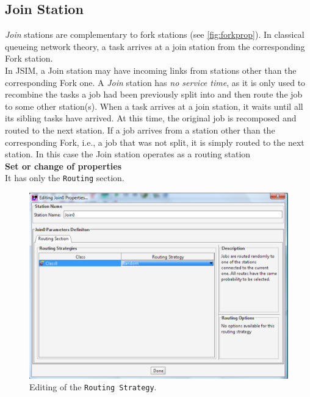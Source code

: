 \subsection{Join Station}
 \emph{Join} stations are complementary to fork
stations (see \autoref{fig:forkprop}). In classical queueing
network theory, a task arrives at a join station from the
corresponding Fork station.\\

In JSIM, a Join station may have incoming links from stations
other than the corresponding Fork one. A \emph{Join} station has
\emph{no service time}, as it is only used to recombine the tasks
a job had been previously split into and then route the job to
some other station(s). When a task arrives at a join station, it
waits until all its sibling tasks have arrived. At this time, the
original job is recomposed and routed to the next station. If a
job arrives from a station other than the corresponding Fork,
i.e., a job that was not split, it is simply routed to the next
station. In this
case the Join station operates as a routing station\\

\noindent \textbf{ Set or change of properties}\\ It has only the
\texttt{Routing} section.\\
\begin{figure}[htb]
    \begin{center}
        \includegraphics[scale=.5]{img/jsimg/8.24.eps}
    \end{center}
    \caption{Editing of the \texttt{Routing Strategy}.}
    \label{fig:edjprop}
\end{figure}

